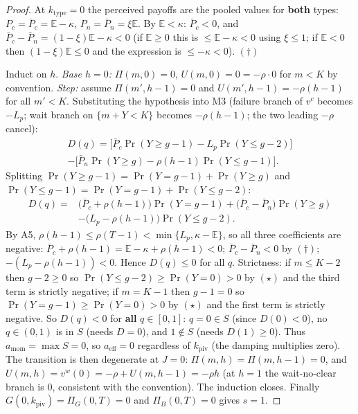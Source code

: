 \begin{proof}
At $k_{\mathrm{type}}=0$ the perceived payoffs are the pooled values for \textbf{both} types:
$P_c=\bar P_c=\mathbb E-\kappa$, $P_n=\bar P_n=\xi\mathbb E$. By $\mathbb E<\kappa$:
$\bar P_c<0$, and $\bar P_c-\bar P_n=(1-\xi)\mathbb E-\kappa<0$ (if $\mathbb E\ge 0$ this is
$\le\mathbb E-\kappa<0$ using $\xi\le 1$; if $\mathbb E<0$ then $(1-\xi)\mathbb E\le 0$ and the
expression is $\le-\kappa<0$). $(\dagger)$

Induct on $h$. \emph{Base $h=0$:} $\Pi(m,0)=0$, $U(m,0)=0=-\rho\cdot 0$ for $m<K$ by
convention. \emph{Step:} assume $\Pi(m',h-1)=0$ and $U(m',h-1)=-\rho(h-1)$ for all $m'<K$.
Substituting the hypothesis into M3 (failure branch of $v^c$ becomes $-L_p$; wait branch on
$\{m+Y<K\}$ becomes $-\rho(h-1)$; the two leading $-\rho$ cancel):
\begin{multline*}
D(q)=\Big[\bar P_c\Pr(Y\ge g-1)-L_p\Pr(Y\le g-2)\Big]\\
-\Big[\bar P_n\Pr(Y\ge g)-\rho(h-1)\Pr(Y\le g-1)\Big].
\end{multline*}
Splitting $\Pr(Y\ge g-1)=\Pr(Y=g-1)+\Pr(Y\ge g)$ and
$\Pr(Y\le g-1)=\Pr(Y=g-1)+\Pr(Y\le g-2)$:
\begin{equation}
\begin{split}
D(q)={}&\big(\bar P_c+\rho(h-1)\big)\Pr(Y=g-1)
+\big(\bar P_c-\bar P_n\big)\Pr(Y\ge g)\\
&-\big(L_p-\rho(h-1)\big)\Pr(Y\le g-2).
\end{split}\tag{L2.1}
\end{equation}
By A5, $\rho(h-1)\le\rho(T-1)<\min\{L_p,\kappa-\mathbb E\}$, so all three coefficients are
negative: $\bar P_c+\rho(h-1)=\mathbb E-\kappa+\rho(h-1)<0$; $\bar P_c-\bar P_n<0$ by
$(\dagger)$; $-(L_p-\rho(h-1))<0$. Hence $D(q)\le 0$ for all $q$. Strictness: if $m\le K-2$
then $g-2\ge 0$ so $\Pr(Y\le g-2)\ge\Pr(Y=0)>0$ by $(\star)$ and the third term is strictly
negative; if $m=K-1$ then $g-1=0$ so $\Pr(Y=g-1)\ge\Pr(Y=0)>0$ by $(\star)$ and the first term
is strictly negative. So $D(q)<0$ for \textbf{all} $q\in[0,1]$: $q=0\in S$ (since $D(0)<0$),
no $q\in(0,1)$ is in $S$ (needs $D=0$), and $1\notin S$ (needs $D(1)\ge 0$). Thus
$a_{\mathrm{mom}}=\max S=0$, so $a_{\mathrm{eff}}=0$ regardless of $k_{\mathrm{piv}}$ (the
damping multiplies zero). The transition is then degenerate at $J=0$:
$\Pi(m,h)=\Pi(m,h-1)=0$, and $U(m,h)=v^w(0)=-\rho+U(m,h-1)=-\rho h$ (at $h=1$ the
wait-no-clear branch is $0$, consistent with the convention). The induction closes. Finally
$G(0,k_{\mathrm{piv}})=\Pi_G(0,T)=0$ and $\Pi_B(0,T)=0$ gives $s=1$.
\end{proof}

